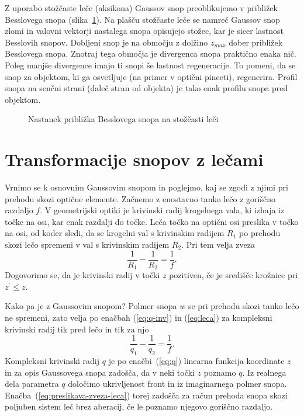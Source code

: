 \begin{remark}
Z uporabo stožčaste leče (aksikona) Gaussov snop
preoblikujemo v približek Besslovega snopa (slika~\ref{fig:Bessel_leca}). 
Na plašču stožčaste leče se namreč Gaussov snop zlomi in valovni vektorji 
nastalega snopa opisujejo stožec, kar je sicer lastnost Besslovih snopov.
Dobljeni snop je na območju z dolžino $z_{max}$ dober približek Besslovega snopa.
Znotraj tega območja je divergenca snopa praktično enaka nič. Poleg manjše divergence
imajo ti snopi še lastnost regeneracije. To pomeni, da se snop 
za objektom, ki ga osvetljuje (na primer v optični pinceti), regenerira. 
Profil snopa na senčni strani (daleč stran od objekta) je tako enak profilu 
snopa pred objektom. 
\begin{figure}[h]
\centering
\def\svgwidth{90truemm} 

\caption{Nastanek približka Besslovega snopa na stožčasti leči}
\label{fig:Bessel_leca}
\end{figure}
\end{remark}

\section{Transformacije snopov z lečami}

Vrnimo se k osnovnim Gaussovim snopom in poglejmo, kaj se zgodi z njimi pri prehodu
skozi optične elemente. Začnemo
z enostavno tanko lečo z goriščno razdaljo $f$. V geometrijski optiki
je krivinski radij krogelnega vala, ki izhaja iz točke na osi, kar
enak razdalji do točke. Leča točko na optični osi preslika v točko na osi,
od koder sledi, da se krogelni val s krivinskim radijem $R_{1}$
po prehodu skozi lečo spremeni v val s krivinskim radijem $R_{2}$.
Pri tem velja zveza 
\begin{equation}
\frac{1}{R_{1}}-\frac{1}{R_{2}}=\frac{1}{f}.
\label{eq:leca}
\end{equation}
Dogovorimo se, da je krivinski radij v točki $z$ pozitiven, če je središče krožnice pri $z^{\prime}\le z$.

Kako pa je z Gaussovim snopom? Polmer snopa $w$ se pri prehodu 
skozi tanko lečo ne spremeni, zato velja po enačbah (\ref{eq:q-inv}) in 
(\ref{eq:leca}) za kompleksni krivinski radij tik pred lečo in tik za njo
\begin{equation}
\frac{1}{q_{1}}-\frac{1}{q_{2}}=\frac{1}{f}.
\label{eq:preslikava-zveza-leca}
\end{equation}
Kompleksni krivinski radij $q$ je po enačbi~(\ref{eq:q}) linearna 
funkcija koordinate $z$ in za opis Gaussovega snopa zadošča, da
v neki točki $z$ poznamo $q$. Iz realnega dela parametra $q$ določimo ukrivljenost front in iz 
imaginarnega polmer snopa. Enačba~(\ref{eq:preslikava-zveza-leca}) torej
zadošča za račun prehoda snopa skozi poljuben sistem leč brez aberacij, če le poznamo
njegovo goriščno razdaljo.

